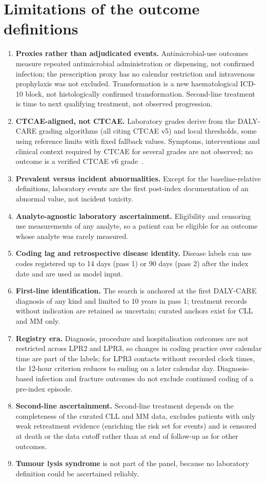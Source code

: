 \documentclass[10pt]{article}
\begin{document}
\section{Limitations of the outcome definitions}\label{sec:limits}
\begin{enumerate}
\item \textbf{Proxies rather than adjudicated events.} Antimicrobial-use
outcomes measure repeated antimicrobial administration or dispensing, not
confirmed infection; the prescription proxy has no calendar restriction and
intravenous prophylaxis was not excluded. Transformation is a new
haematological ICD-10 block, not histologically confirmed transformation.
Second-line treatment is time to next qualifying treatment, not observed
progression.
\item \textbf{CTCAE-aligned, not CTCAE.} Laboratory grades derive from the
DALY-CARE grading algorithms (all citing CTCAE v5) and local
thresholds, some using reference limits with fixed fallback values. Symptoms,
interventions and clinical context required by CTCAE for several grades are
not observed; no outcome is a verified CTCAE v6 grade~\citep{nci2017ctcae,nci2025ctcae}.
\item \textbf{Prevalent versus incident abnormalities.} Except for the
baseline-relative definitions, laboratory events are the first post-index
documentation of an abnormal value, not incident toxicity.
\item \textbf{Analyte-agnostic laboratory ascertainment.} Eligibility and
censoring use measurements of any analyte, so a patient can be eligible for an
outcome whose analyte was rarely measured.
\item \textbf{Coding lag and retrospective disease identity.} Disease labels
can use codes registered up to 14 days (pass 1) or 90 days (pass 2) after the
index date and are used as model input.
\item \textbf{First-line identification.} The search is anchored at the first
DALY-CARE diagnosis of any kind and limited to 10 years in pass 1; treatment
records without indication are retained as uncertain; curated anchors exist
for CLL and MM only.
\item \textbf{Registry era.} Diagnosis, procedure and hospitalisation outcomes
are not restricted across LPR2 and LPR3, so changes in coding practice over
calendar time are part of the labels; for LPR3 contacts without recorded clock
times, the 12-hour criterion reduces to ending on a later calendar day.
Diagnosis-based infection and fracture outcomes do not exclude continued coding
of a pre-index episode.
\item \textbf{Second-line ascertainment.} Second-line treatment depends on the
completeness of the curated CLL and MM data, excludes patients with only weak
retreatment evidence (enriching the risk set for events) and is censored at
death or the data cutoff rather than at end of follow-up as for other
outcomes.
\item \textbf{Tumour lysis syndrome} is not part of the panel, because no
laboratory definition could be ascertained reliably.
\end{enumerate}



\end{document}
